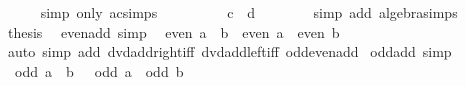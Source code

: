 \begin{isabellebody}
\ \ \ \ \isamarkupfalse%
\ {\isacharparenleft}{\kern0pt}simp\ only{\isacharcolon}{\kern0pt}\ ac{\isacharunderscore}{\kern0pt}simps{\isacharparenright}{\kern0pt}\isanewline
\ \ \isamarkupfalse%
\ \isamarkupfalse%
\ {\isachardoublequoteopen}{\isasymdots}\ {\isacharequal}{\kern0pt}\ {}\ {\isacharasterisk}{\kern0pt}\ {\isacharparenleft}{\kern0pt}c\ {\isacharplus}{\kern0pt}\ d\ {\isacharplus}{\kern0pt}\ {}{\isacharparenright}{\kern0pt}{\isachardoublequoteclose}\isanewline
\ \ \ \ \isamarkupfalse%
\ {\isacharparenleft}{\kern0pt}simp\ add{\isacharcolon}{\kern0pt}\ algebra{\isacharunderscore}{\kern0pt}simps{\isacharparenright}{\kern0pt}\isanewline
\ \ \isamarkupfalse%
\ \isamarkupfalse%
\ {\isacharquery}{\kern0pt}thesis\ \isacommand{{\isachardot}{\kern0pt}{\isachardot}{\kern0pt}}\isamarkupfalse%
\isanewline
{}\isamarkupfalse%
%
\endisatagproof
{\isafoldproof}%
%
\isadelimproof
\isanewline
%
\endisadelimproof
\isanewline
{}\isamarkupfalse%
\ even{\isacharunderscore}{\kern0pt}add\ {\isacharbrackleft}{\kern0pt}simp{\isacharbrackright}{\kern0pt}{\isacharcolon}{\kern0pt}\isanewline
\ \ {\isachardoublequoteopen}even\ {\isacharparenleft}{\kern0pt}a\ {\isacharplus}{\kern0pt}\ b{\isacharparenright}{\kern0pt}\ {\isasymlongleftrightarrow}\ {\isacharparenleft}{\kern0pt}even\ a\ {\isasymlongleftrightarrow}\ even\ b{\isacharparenright}{\kern0pt}{\isachardoublequoteclose}\isanewline
%
\isadelimproof
\ \ %
\endisadelimproof
%
\isatagproof
{}\isamarkupfalse%
\ {\isacharparenleft}{\kern0pt}auto\ simp\ add{\isacharcolon}{\kern0pt}\ dvd{\isacharunderscore}{\kern0pt}add{\isacharunderscore}{\kern0pt}right{\isacharunderscore}{\kern0pt}iff\ dvd{\isacharunderscore}{\kern0pt}add{\isacharunderscore}{\kern0pt}left{\isacharunderscore}{\kern0pt}iff\ odd{\isacharunderscore}{\kern0pt}even{\isacharunderscore}{\kern0pt}add{\isacharparenright}{\kern0pt}%
\endisatagproof
{\isafoldproof}%
%
\isadelimproof
\isanewline
%
\endisadelimproof
\isanewline
{}\isamarkupfalse%
\ odd{\isacharunderscore}{\kern0pt}add\ {\isacharbrackleft}{\kern0pt}simp{\isacharbrackright}{\kern0pt}{\isacharcolon}{\kern0pt}\isanewline
\ \ {\isachardoublequoteopen}odd\ {\isacharparenleft}{\kern0pt}a\ {\isacharplus}{\kern0pt}\ b{\isacharparenright}{\kern0pt}\ {\isasymlongleftrightarrow}\ {\isasymnot}\ {\isacharparenleft}{\kern0pt}odd\ a\ {\isasymlongleftrightarrow}\ odd\ b{\isacharparenright}{\kern0pt}{\isachardoublequoteclose}\isanewline
%
\isadelimproof

\end{isabellebody}
